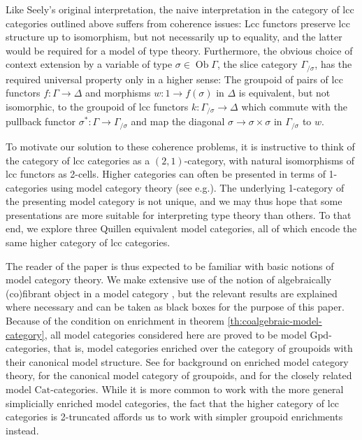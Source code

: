 \documentclass[a4paper]{article}
\theoremstyle{remark}
\theoremstyle{definition}
\begin{document}
Like Seely's original interpretation, the naive interpretation in the category of lcc categories outlined above suffers from coherence issues:
Lcc functors preserve lcc structure up to isomorphism, but not necessarily up to equality, and the latter would be required for a model of type theory.
Furthermore, the obvious choice of context extension by a variable of type $\sigma \in \operatorname{Ob} \Gamma$, the slice category $\Gamma_{/ \sigma}$, has the required universal property only in a higher sense:
The groupoid of pairs of lcc functors $f : \Gamma \rightarrow \Delta$ and morphisms $w : 1 \rightarrow f(\sigma)$ in $\Delta$ is equivalent, but not isomorphic, to the groupoid of lcc functors $k : \Gamma_{/ \sigma} \rightarrow \Delta$ which commute with the pullback functor $\sigma^* : \Gamma \rightarrow \Gamma_{/ \sigma}$ and map the diagonal $\sigma \rightarrow \sigma \times \sigma$ in $\Gamma_{/ \sigma}$ to $w$.

To motivate our solution to these coherence problems, it is instructive to think of the category of lcc categories as a $(2, 1)$-category, with natural isomorphisms of lcc functors as 2-cells.
Higher categories can often be presented in terms of 1-categories using model category theory (see e.g.\@ \citet{hirschhorn}).
The underlying 1-category of the presenting model category is not unique, and we may thus hope that some presentations are more suitable for interpreting type theory than others.
To that end, we explore three Quillen equivalent model categories, all of which encode the same higher category of lcc categories.

The reader of the paper is thus expected to be familiar with basic notions of model category theory.
We make extensive use of the notion of algebraically (co)fibrant object in a model category \citep{algebraic-models,coalgebraic-models}, but the relevant results are explained where necessary and can be taken as black boxes for the purpose of this paper.
Because of the condition on enrichment in theorem \ref{th:coalgebraic-model-category}, all model categories considered here are proved to be model $\mathrm{Gpd}$-categories, that is, model categories enriched over the category of groupoids with their canonical model structure.
See \citet{enriched-model-cats} for background on enriched model category theory, \citet{groupoid-model-cat} for the canonical model category of groupoids, and \citet{homotopy-theoretic-aspects} for the closely related model $\mathrm{Cat}$-categories.
While it is more common to work with the more general simplicially enriched model categories, the fact that the higher category of lcc categories is 2-truncated affords us to work with simpler groupoid enrichments instead.
\end{document}
